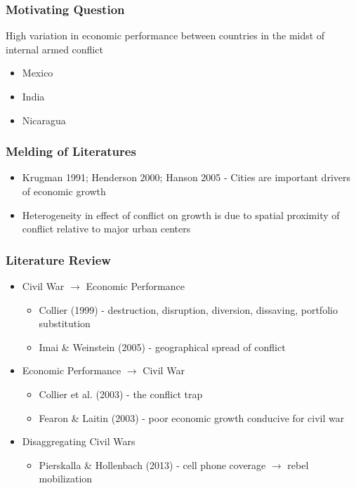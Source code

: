 
\begin{frame}
\frametitle{Motivating Question}

High variation in economic performance between countries in the midst of internal armed conflict

\begin{itemize}
\item Mexico
\item India
\item Nicaragua
\end{itemize}


\end{frame}

\begin{frame}
\frametitle{Melding of Literatures}

\begin{itemize}
\item Krugman 1991; Henderson 2000; Hanson 2005 - Cities are important drivers of economic growth
\item Heterogeneity in effect of conflict on growth is due to spatial proximity of conflict relative to major urban centers
\end{itemize}

\end{frame}

\begin{frame}
\frametitle{Literature Review}

\begin{itemize}
	\item Civil War $\rightarrow$ Economic Performance
	\begin{itemize}
	\item Collier (1999) - destruction, disruption, diversion, dissaving, portfolio substitution
	\item Imai \& Weinstein (2005) - geographical spread of conflict
	\end{itemize}
	\item Economic Performance $\rightarrow$ Civil War
	\begin{itemize}
	\item Collier et al. (2003) - the conflict trap
	\item Fearon \& Laitin (2003) - poor economic growth conducive for civil war
	\end{itemize}
	\item Disaggregating Civil Wars
	\begin{itemize}
	\item Pierskalla \& Hollenbach (2013) - cell phone coverage $\rightarrow$ rebel mobilization
	\end{itemize}
\end{itemize}

\end{frame}

